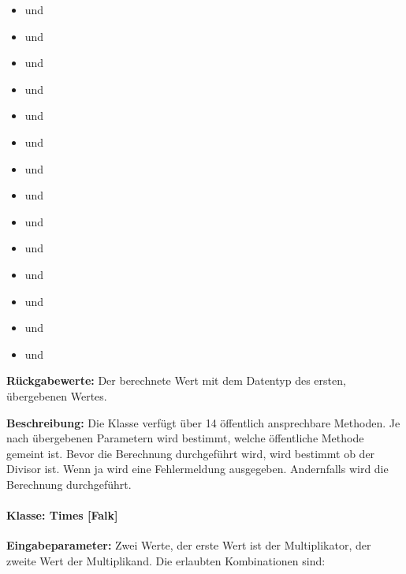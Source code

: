 \begin{itemize}
	\item {} und 
	\item {} und 
	\item {} und  
	\item {} und  
	\item {} und 
	\item {} und 
	\item {} und 
	\item {} und 
	\item {} und 
	\item {} und 
	\item {} und 
	\item {} und 
	\item {} und 
	\item {} und  
\end{itemize}

\textbf{Rückgabewerte:} Der berechnete Wert mit dem Datentyp des ersten, übergebenen Wertes.
 
\textbf{Beschreibung: }Die Klasse verfügt über 14 öffentlich ansprechbare Methoden. Je nach übergebenen Parametern wird bestimmt, welche öffentliche Methode gemeint ist. Bevor die Berechnung durchgeführt wird, wird bestimmt ob der Divisor  ist. Wenn ja wird eine Fehlermeldung ausgegeben. Andernfalls wird die Berechnung durchgeführt. 

\paragraph{Klasse: Times [Falk]}

\textbf{Eingabeparameter:} Zwei Werte, der erste Wert ist der Multiplikator, der zweite Wert der Multiplikand. Die erlaubten Kombinationen sind: 

